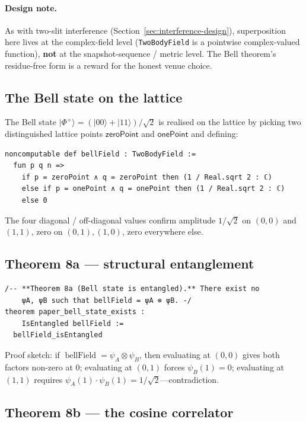 \documentclass[11pt,a4paper,twoside]{article}
\theoremstyle{definition}
\newcommand{\code}[1]{\texttt{#1}}
\newcommand{\BellField}{\operatorname{bellField}}
\begin{document}
\paragraph{Design note.}
As with two-slit interference
(Section~\ref{sec:interference-design}), superposition here lives at
the complex-field level (\code{TwoBodyField} is a pointwise
complex-valued function), \textbf{not} at the snapshot-sequence /
metric level. The Bell theorem's residue-free form is a reward for
the honest venue choice.

\subsection{The Bell state on the lattice}\label{sec:bell-lattice}

The Bell state $|\Phi^{+}\rangle=(|00\rangle+|11\rangle)/\sqrt{2}$ is
realised on the lattice by picking two distinguished lattice points
$\mathsf{zeroPoint}$ and $\mathsf{onePoint}$ and defining:
\begin{lstlisting}
noncomputable def bellField : TwoBodyField :=
  fun p q n =>
    if p = zeroPoint ∧ q = zeroPoint then (1 / Real.sqrt 2 : ℂ)
    else if p = onePoint ∧ q = onePoint then (1 / Real.sqrt 2 : ℂ)
    else 0
\end{lstlisting}

The four diagonal / off-diagonal values confirm amplitude $1/\sqrt{2}$
on $(0,0)$ and $(1,1)$, zero on $(0,1),(1,0)$, zero everywhere else.

\subsection{Theorem 8a --- structural entanglement}\label{sec:T8a}

\begin{lstlisting}
/-- **Theorem 8a (Bell state is entangled).** There exist no
    ψA, ψB such that bellField = ψA ⊗ ψB. -/
theorem paper_bell_state_exists :
    IsEntangled bellField :=
  bellField_isEntangled
\end{lstlisting}

Proof sketch: if $\BellField=\psi_{A}\otimes\psi_{B}$, then
evaluating at $(0,0)$ gives both factors non-zero at $0$; evaluating
at $(0,1)$ forces $\psi_{B}(1)=0$; evaluating at $(1,1)$ requires
$\psi_{A}(1)\cdot\psi_{B}(1)=1/\sqrt{2}$---contradiction.

\subsection{Theorem 8b --- the cosine
correlator}\label{sec:T8b}
\end{document}
